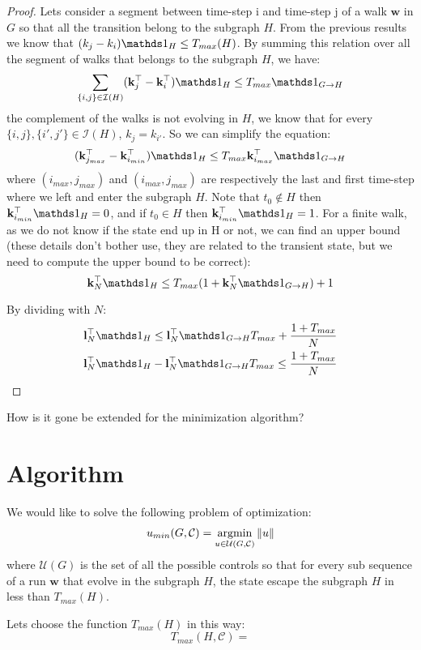 \documentclass{article}
\begin{document}
\begin{proof}
Lets consider a segment between time-step i and time-step j of a walk $\mathbf{w}$ in $G$ so that all the transition belong to the subgraph $H$. From the previous results we know that $(k_j -k_i) \vone_H \leq T_{max}(H)$. By summing this relation over all the segment of walks that belongs to the subgraph $H$, we have:
\begin{equation}
\sum_{\{i,j\} \in \mathcal{I}(H)} (\mathbf{k}_j^\top - \mathbf{k}_i^\top) \vone_H \leq T_{max} \vone_{G \rightarrow H}
\end{equation}
the complement of the walks is not evolving in $H$, we know that for every $\{i,j\},\{i',j'\} \in \mathcal{I}(H)$, $k_{j} = k_{i'}$. So we can simplify the equation:
\begin{equation}
(\mathbf{k}_{j_{max}}^\top - \mathbf{k}_{i_{min}}^\top ) \vone_H \leq T_{max} \mathbf{k}_{i_{max}}^\top \vone_{G \rightarrow H}
\end{equation}
where $(i_{max},j_{max})$ and $(i_{max},j_{max})$ are respectively the last and first time-step where we left and enter the subgraph $H$.
Note that $t_0 \notin H$ then $\mathbf{k}_{i_{min}}^\top \vone_H = 0$, and if $t_0 \in H$ then $\mathbf{k}_{i_{min}}^\top \vone_H = 1$.
For a finite walk, as we do not know if the state end up in H or not, we can find an upper bound (these details don't bother use, they are related to the transient state, but we need to compute the upper bound to be correct):
\begin{equation}
\mathbf{k}_{N}^\top \vone_H \leq T_{max} (1+\mathbf{k}_N^\top \vone_{G \rightarrow H}) + 1
\end{equation}

By dividing with $N$:
\begin{align*}
\mathbf{l}_{N}^\top \vone_H &\leq \mathbf{l}_N^\top \vone_{G \rightarrow H} T_{max} + \frac{1+T_{max}}{N} \\
\mathbf{l}_{N}^\top \vone_H &- \mathbf{l}_N^\top \vone_{G \rightarrow H} T_{max} \leq \frac{1+T_{max}}{N} 
\end{align*}

\end{proof}


How is it gone be extended for the minimization algorithm?

\section{Algorithm}
We would like to solve the following problem of optimization:
\begin{equation}
\begin{split}
u_{min}(G,\mathcal{C}) = \argmin_{u \in \mathcal{U}(G,\mathcal{C})} & \left \| u \right \| \\
\end{split}
\end{equation}
where $\mathcal{U}(G)$ is the set of all the possible controls so that for every sub sequence of a run $\mathbf{w}$ that evolve in the subgraph $H$, the state escape the subgraph $H$ in less than $T_{max}(H)$.

Lets choose the function $T_{max}(H)$ in this way:
\begin{equation}
T_{max}(H,\mathcal{C}) = 
\end{equation}
\end{document}
